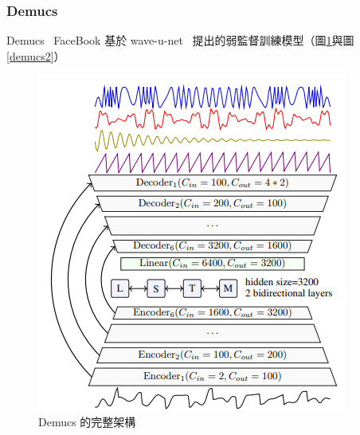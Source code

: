 \subsubsection{Demucs}
Demucs~\cite{defossez2019music} FaceBook 基於 wave-u-net~\cite{stoller2018wave} 提出的弱監督訓練模型（圖\ref{demucs1}與圖\ref{demucs2}）
\begin{figure}[htbp]
    \hfil
    \begin{minipage}[t]{0.45\textwidth}
        \centering
        \includegraphics[width=\textwidth]{./figures/chapter02_method/demucs1.png}
        \caption {Demucs 的完整架構}
        \label{demucs1}
    \end{minipage}
    \begin{minipage}[t]{0.45\textwidth}
        \centering

\end{minipage}
\end{figure}
